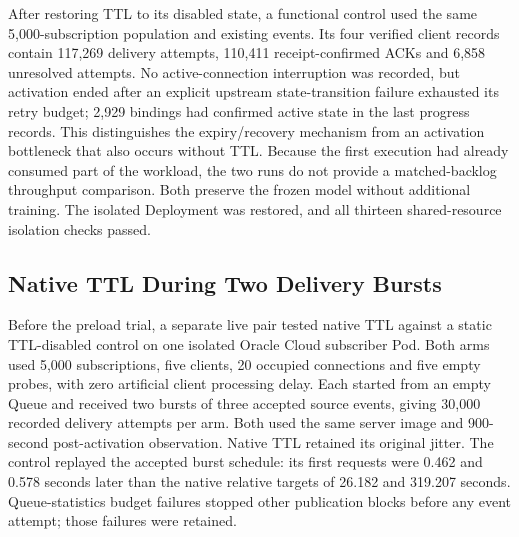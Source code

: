 After restoring TTL to its disabled state, a functional control used the same
5,000-subscription population and existing events. Its four verified client
records contain 117,269 delivery attempts, 110,411 receipt-confirmed ACKs and
6,858 unresolved attempts. No active-connection interruption was recorded,
but activation ended after an explicit upstream state-transition failure
exhausted its retry budget; 2,929 bindings had confirmed active state in the
last progress records. This distinguishes the expiry/recovery mechanism from
an activation bottleneck that also occurs without TTL. Because the first
execution had already consumed part of the workload, the two runs do not
provide a matched-backlog throughput comparison. Both preserve the frozen
model without additional training. The isolated Deployment was restored,
and all thirteen shared-resource isolation checks passed.

\subsection{Native TTL During Two Delivery Bursts}
\label{sec:ttl-loaded-results}

Before the preload trial, a separate live pair tested native TTL against a
static TTL-disabled control on one isolated Oracle Cloud subscriber Pod.
Both arms used 5,000 subscriptions, five clients, 20 occupied connections and
five empty probes, with zero artificial client processing delay. Each started
from an empty Queue and received two bursts of three accepted source events,
giving 30,000 recorded delivery attempts per arm. Both used the same server
image and 900-second post-activation observation. Native TTL retained its
original jitter. The control replayed the accepted burst schedule: its first
requests were 0.462 and 0.578 seconds later than the native relative targets
of 26.182 and 319.207 seconds. Queue-statistics budget failures stopped other
publication blocks before any event attempt; those failures were retained.

